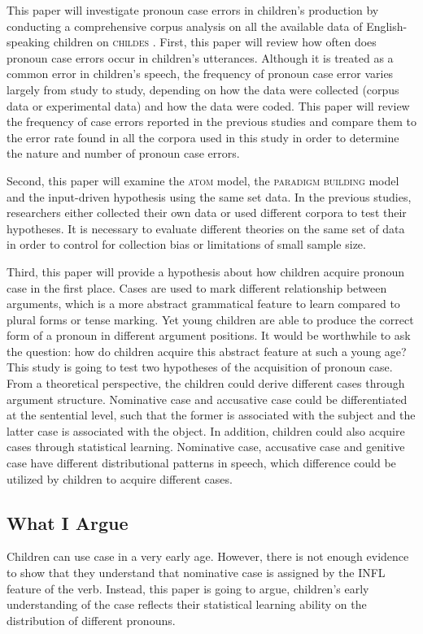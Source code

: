 This paper will investigate pronoun case errors in children's production by conducting a comprehensive corpus analysis on all the available data of English-speaking children on \textsc{childes} \citep{macwhinney2014childes}. First, this paper will review how often does pronoun case errors occur in children's utterances. Although it is treated as a common error in children's speech, the frequency of pronoun case error varies largely from study to study, depending on how the data were collected (corpus data or experimental data) and how the data were coded. This paper will review the frequency of case errors reported in the previous studies and compare them to the error rate found in all the corpora used in this study in order to determine the nature and number of pronoun case errors.

Second, this paper will examine the \textsc{atom} model, the \textsc{paradigm building} model and the input-driven hypothesis using the same set data. In the previous studies, researchers either collected their own data or used different corpora to test their hypotheses. It is necessary to evaluate different theories on the same set of data in order to control for collection bias or limitations of small sample size. 

Third, this paper will provide a hypothesis about how children acquire pronoun case in the first place. Cases are used to mark different relationship between arguments, which is a more abstract grammatical feature to learn compared to plural forms or tense marking. Yet young children are able to produce the correct form of a pronoun in different argument positions. It would be worthwhile to ask the question: how do children acquire this abstract feature at such a young age? This study is going to test two hypotheses of the acquisition of pronoun case. From a theoretical perspective, the children could derive different cases through argument structure. Nominative case and accusative case could be differentiated at the sentential level, such that the former is associated with the subject and the latter case is associated with the object. In addition, children could also acquire cases through statistical learning. Nominative case, accusative case and genitive case have different distributional patterns in speech, which difference could be utilized by children to acquire different cases. 

\subsection{What I Argue}
Children can use case in a very early age. However, there is not enough evidence to show that they understand that nominative case is assigned by the INFL feature of the verb. Instead, this paper is going to argue, children's early understanding of the case reflects their statistical learning ability on the distribution of different pronouns. 